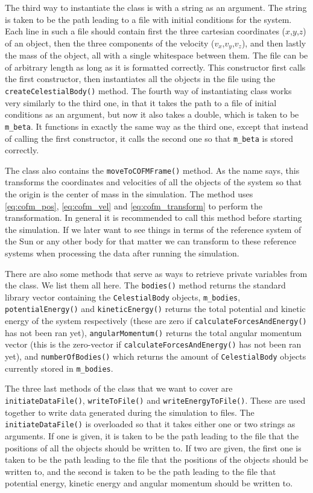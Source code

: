 \documentclass[reprint,english,notitlepage]{revtex4-1}  %
\begin{document}
\label{poi:initfile}
The third way to instantiate the class is with a string as an argument. The string is taken to be the path leading to a file with initial conditions for the system. Each line in such a file should contain first the three cartesian coordinates ($x$,$y$,$z$) of an object, then the three components of the velocity ($v_x$,$v_y$,$v_z$), and then  lastly the mass of the object, all with a single whitespace between them. The file can be of arbitrary length as long as it is formatted correctly. This constructor first calls the first constructor, then instantiates all the objects in the file using the \verb+createCelestialBody()+ method. The fourth way of instantiating class works very similarly to the third one, in that it takes the path to a file of initial conditions as an argument, but now it also takes a double, which is taken to be \verb+m_beta+. It functions in exactly the same way as the third one, except that instead of calling the first constructor, it calls the second one so that \verb+m_beta+ is stored correctly.

The class also contains the \verb+moveToCOFMFrame()+ method. As the name says, this transforms the coordinates and velocities of all the objects of the system so that the origin is the center of mass in the simulation. The method uses \eqref{eq:cofm_pos}, \eqref{eq:cofm_vel} and \eqref{eq:cofm_transform} to perform the transformation. In general it is recommended to call this method before starting the simulation. If we later want to see things in terms of the reference system of the Sun or any other body for that matter we can transform to these reference systems when processing the data after running the simulation.

There are also some methods that serve as ways to retrieve private variables from the class. We list them all here. The \verb+bodies()+ method returns the standard library vector containing the \verb+CelestialBody+ objects, \verb+m_bodies+, \verb+potentialEnergy()+ and \verb+kineticEnergy()+ returns the total potential and kinetic energy of the system respectively (these are zero if \verb+calculateForcesAndEnergy()+ has not been ran yet), \verb+angularMomentum()+ returns the total angular momentum vector (this is the zero-vector if \verb+calculateForcesAndEnergy()+ has not been ran yet), and \verb+numberOfBodies()+ which returns the amount of \verb+CelestialBody+ objects currently stored in \verb+m_bodies+.

The three last methods of the class that we want to cover are \verb+initiateDataFile()+, \verb+writeToFile()+ and \verb+writeEnergyToFile()+. These are used together to write data generated during the simulation to files. The \verb+initiateDataFile()+ is overloaded so that it takes either one or two strings as arguments. If one is given, it is taken to be the path leading to the file that the positions of all the objects should be written to. If two are given, the first one is taken to be the path leading to the file that the positions of the objects should be written to, and the second is taken to be the path leading to the file that potential energy, kinetic energy and angular momentum should be written to. \newline
\end{document}
